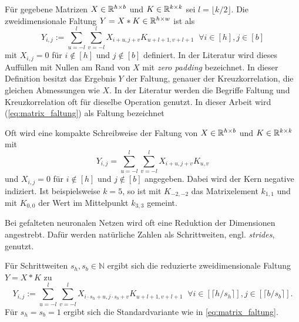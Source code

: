 \begin{defi} \label{def:matrix_faltung}
    Für gegebene Matrizen $X \in \mathbb{R}^{h \times b}$ und $K \in \mathbb{R}^{k \times k}$ sei $l=\lfloor k/2  \rfloor$.
    Die zweidimensionale Faltung  $Y=X \ast K \in \mathbb{R}^{h \times w}$ ist als 
    \begin{equation}
        \label{eq:matrix_faltung}
        Y_{i,j}:=\sum_{u=-l}^{l} \sum_{v=-l}^{l} X_{i+u,j+v} K_{u+l+1,v+l+1}\; \; \forall i \in [h], j \in [b]
    \end{equation} mit $X_{i,j}=0$ für $i \notin [h]$ und $j \notin [b]$ definiert. In der Literatur wird dieses Auffüllen mit Nullen am Rand von $X$ mit \textit{zero padding} bezeichnet. In dieser Definition besitzt das Ergebnis $Y$ der Faltung, genauer der Kreuzkorrelation, die gleichen Abmessungen wie $X$. In der Literatur werden die Begriffe Faltung und Kreuzkorrelation oft für dieselbe Operation genutzt. In dieser Arbeit wird (\ref{eq:matrix_faltung}) als Faltung bezeichnet 
\end{defi}

\begin{bem}
    Oft wird eine kompakte Schreibweise der Faltung von $X \in \mathbb{R}^{h \times b}$ und $ K \in \mathbb{R}^{k \times k}$ mit 
    \begin{equation}
        \label{eq:valid_conv}
        Y_{i,j}=\sum_{u=-l}^l \sum_{v=-l}^l X_{i+u,j+v}K_{u,v}
    \end{equation}
    und $X_{i,j}=0$ für $i \notin [h]$ und $j \notin [b]$ angegeben. Dabei wird der Kern negative indiziert. Ist beispielsweise $k=5$, so ist mit $K_{-2,-2}$ das Matrixelement $k_{1,1}$ und mit $K_{0,0}$ der Wert im Mittelpunkt $k_{3,3}$ gemeint. 
\end{bem}

Bei gefalteten neuronalen Netzen wird oft eine Reduktion der Dimensionen angestrebt. Dafür werden natürliche Zahlen als Schrittweiten, engl. \textit{strides}, genutzt.
\begin{bem}\label{bem_strides}
    Für Schrittweiten $s_h, s_b \in \mathbb{N}$ ergibt sich die reduzierte zweidimensionale Faltung $Y=X \ast K$ zu
    \begin{equation*}
        Y_{i,j}:=\sum_{u=-l}^{l} \sum_{v=-l}^{l} X_{i \cdot s_h +u,j \cdot s_b +v} K_{u+l+1, v+l+1}\; \; \forall i \in [\lceil h/s_h \rceil], j \in [\lceil b/s_b \rceil].
    \end{equation*}
    Für $s_h=s_b=1$ ergibt sich die Standardvariante wie in \ref{eq:matrix_faltung}.
    \end{bem}

